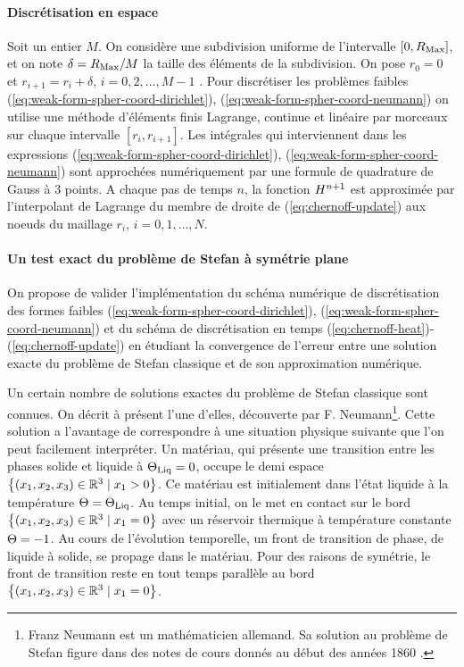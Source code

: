 \paragraph{Discrétisation en espace}
Soit un entier $M$. On considère une subdivision uniforme de
l'intervalle $[0, R_\mathrm{Max}]$, et on note $\delta = R_\mathrm{Max}/M$ la taille des
éléments de la subdivision. On pose $r_0 = 0$ et $r_{i+1} = r_i +
\delta$, $i = 0,2,\dots, M-1$ . Pour discrétiser les problèmes faibles
(\ref{eq:weak-form-spher-coord-dirichlet}),
(\ref{eq:weak-form-spher-coord-neumann}) on utilise une méthode
d'éléments finis Lagrange, continue et linéaire par morceaux sur
chaque intervalle $[r_i, r_{i+1}]$. Les intégrales qui interviennent
dans les expressions (\ref{eq:weak-form-spher-coord-dirichlet}),
(\ref{eq:weak-form-spher-coord-neumann}) sont approchées numériquement
par une formule de quadrature de Gauss à 3 points.
A chaque pas de temps $n$, la fonction $H^{n+1}$ est
approximée par l'interpolant de Lagrange du membre de droite de
(\ref{eq:chernoff-update}) aux noeuds du maillage $r_i$, $i =
0,1,\dots, N$.

\paragraph{Un test exact du problème de Stefan à symétrie plane}
On propose de valider l'implémentation du schéma numérique de
discrétisation des formes faibles
(\ref{eq:weak-form-spher-coord-dirichlet}),
(\ref{eq:weak-form-spher-coord-neumann}) et du schéma de
discrétisation en temps
(\ref{eq:chernoff-heat})-(\ref{eq:chernoff-update}) en étudiant la
convergence de l'erreur entre une solution exacte du problème de
Stefan classique et de son approximation numérique.

Un certain nombre de solutions exactes du problème de Stefan classique
sont connues. On décrit à présent l'une d'elles, découverte par
F. Neumann\footnote{Franz Neumann est un mathématicien allemand. Sa
  solution au problème de Stefan figure dans des notes de cours donnés
  au début des années 1860 \cite{HillStefanProblems}.}. Cette solution
a l'avantage de correspondre à une situation physique suivante que
l'on peut facilement interpréter.  Un matériau, qui présente une
transition entre les phases solide et liquide à $\Theta_\text{Liq} = 0$, occupe le
demi espace $\left\{ (x_1, x_2, x_3)\in \mathbb R^3 \mid x_1 >
  0 \right\}$. Ce matériau est initialement dans l'état liquide à la
température $\Theta = \Theta_\text{Liq}$. Au temps initial, on le met en
contact sur le bord $\left\{ (x_1, x_2, x_3)\in\mathbb R^3 \mid x_1 =
  0 \right\}$ avec un réservoir thermique à température constante
$\Theta = -1$. Au cours de l'évolution temporelle, un front de
transition de phase, de liquide à solide, se propage dans le
matériau. Pour des raisons de symétrie, le front de transition reste
en tout temps parallèle au bord $\left\{ (x_1, x_2, x_3)\in\mathbb
  R^3 \mid x_1 = 0 \right\}$.


